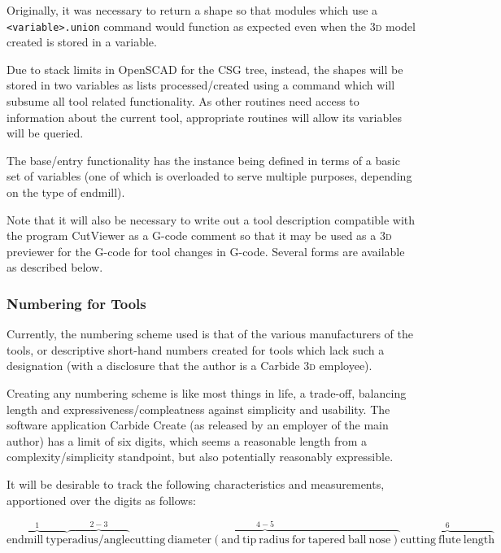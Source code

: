 \documentclass{ltxdoc}
\begin{document}
Originally, it was necessary to return a shape so that modules which use a \verb|<variable>.union| command would function as expected even when the \textsc{3d} model created is stored in a variable.

Due to stack limits in OpenSCAD for the CSG tree, instead, the shapes will be stored in two variables as lists processed/created using a command  which will subsume all tool related functionality. As other routines need access to information about the current tool, appropriate routines will allow its variables will be queried. 

The base/entry functionality has the instance being defined in terms of a basic set of variables (one of which is overloaded to serve multiple purposes, depending on the type of endmill).

Note that it will also be necessary to write out a tool description compatible with the program CutViewer as a G-code comment so that it may be used as a \textsc{3d} previewer for the G-code for tool changes in G-code. Several forms are available as described below.

\subsubsection{Numbering for Tools}

Currently, the numbering scheme used is that of the various manufacturers of the tools, or descriptive short-hand numbers created for tools which lack such a designation (with a disclosure that the author is a Carbide \textsc{3d} employee).

Creating any numbering scheme is like most things in life, a trade-off, balancing length and expressiveness/compleatness against simplicity and usability. The software application Carbide Create (as released by an employer of the main author) has a limit of six digits, which seems a reasonable length from a complexity/simplicity standpoint, but also potentially reasonably expressible.

It will be desirable to track the following characteristics and measurements, apportioned over the digits as follows:

\begin{equation*}
\overbrace{\mathrm{endmill\ type}}^1
\overbrace{\mathrm{radius/angle}}^{2-3}
\overbrace{\mathrm{cutting\ diameter (and\ tip\ radius\ for\ tapered\ ball\ nose)}}^{4-5}
\overbrace{\mathrm{cutting\ flute\ length}}^6
\end{equation*}
\end{document}
